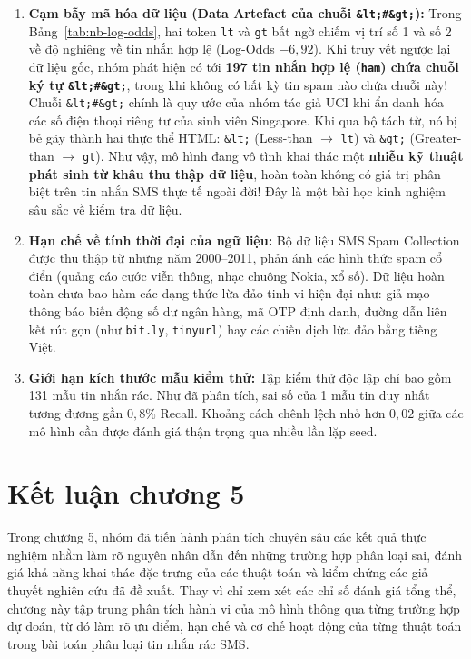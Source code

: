 \begin{enumerate}
    \item \textbf{Cạm bẫy mã hóa dữ liệu (Data Artefact của chuỗi \texttt{\&lt;\#\&gt;}):}
    Trong Bảng~\ref{tab:nb-log-odds}, hai token \texttt{lt} và \texttt{gt} bất ngờ chiếm vị trí số 1 và số 2 về độ nghiêng về tin nhắn hợp lệ (Log-Odds $-6,92$). Khi truy vết ngược lại dữ liệu gốc, nhóm phát hiện có tới \textbf{197 tin nhắn hợp lệ (\texttt{ham}) chứa chuỗi ký tự \texttt{\&lt;\#\&gt;}}, trong khi không có bất kỳ tin spam nào chứa chuỗi này! Chuỗi \texttt{\&lt;\#\&gt;} chính là quy ước của nhóm tác giả UCI khi ẩn danh hóa các số điện thoại riêng tư của sinh viên Singapore. Khi qua bộ tách từ, nó bị bẻ gãy thành hai thực thể HTML: \texttt{\&lt;} (Less-than $\rightarrow$ \texttt{lt}) và \texttt{\&gt;} (Greater-than $\rightarrow$ \texttt{gt}). Như vậy, mô hình đang vô tình khai thác một \textbf{nhiễu kỹ thuật phát sinh từ khâu thu thập dữ liệu}, hoàn toàn không có giá trị phân biệt trên tin nhắn SMS thực tế ngoài đời! Đây là một bài học kinh nghiệm sâu sắc về kiểm tra dữ liệu.
    \item \textbf{Hạn chế về tính thời đại của ngữ liệu:}
    Bộ dữ liệu SMS Spam Collection được thu thập từ những năm 2000--2011, phản ánh các hình thức spam cổ điển (quảng cáo cước viễn thông, nhạc chuông Nokia, xổ số). Dữ liệu hoàn toàn chưa bao hàm các dạng thức lừa đảo tinh vi hiện đại như: giả mạo thông báo biến động số dư ngân hàng, mã OTP định danh, đường dẫn liên kết rút gọn (như \texttt{bit.ly}, \texttt{tinyurl}) hay các chiến dịch lừa đảo bằng tiếng Việt.
    \item \textbf{Giới hạn kích thước mẫu kiểm thử:}
    Tập kiểm thử độc lập chỉ bao gồm 131 mẫu tin nhắn rác. Như đã phân tích, sai số của 1 mẫu tin duy nhất tương đương gần $0,8\%$ Recall. Khoảng cách chênh lệch nhỏ hơn $0,02$ giữa các mô hình cần được đánh giá thận trọng qua nhiều lần lặp seed.
\end{enumerate}

\section{Kết luận chương 5}
\label{sec:ket-luan-chuong5}

Trong chương 5, nhóm đã tiến hành phân tích chuyên sâu các kết quả thực nghiệm nhằm làm rõ nguyên nhân dẫn đến những trường hợp phân loại sai, đánh giá khả năng khai thác đặc trưng của các thuật toán và kiểm chứng các giả thuyết nghiên cứu đã đề xuất. Thay vì chỉ xem xét các chỉ số đánh giá tổng thể, chương này tập trung phân tích hành vi của mô hình thông qua từng trường hợp dự đoán, từ đó làm rõ ưu điểm, hạn chế và cơ chế hoạt động của từng thuật toán trong bài toán phân loại tin nhắn rác SMS.


